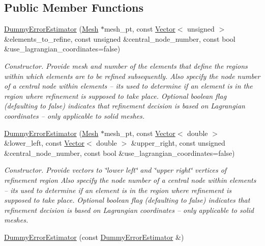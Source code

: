 \subsection*{Public Member Functions}
\begin{DoxyCompactItemize}
\item 
\hyperlink{classoomph_1_1DummyErrorEstimator_a32f15a763f800e451cc9ddec074cd25c}{Dummy\+Error\+Estimator} (\hyperlink{classoomph_1_1Mesh}{Mesh} $\ast$mesh\+\_\+pt, const \hyperlink{classoomph_1_1Vector}{Vector}$<$ unsigned $>$ \&elements\+\_\+to\+\_\+refine, const unsigned \&central\+\_\+node\+\_\+number, const bool \&use\+\_\+lagrangian\+\_\+coordinates=false)
\begin{DoxyCompactList}\small\item\em Constructor. Provide mesh and number of the elements that define the regions within which elements are to be refined subsequently. Also specify the node number of a central node within elements -- it\textquotesingle{}s used to determine if an element is in the region where refinement is supposed to take place. Optional boolean flag (defaulting to false) indicates that refinement decision is based on Lagrangian coordinates -- only applicable to solid meshes. \end{DoxyCompactList}\item 
\hyperlink{classoomph_1_1DummyErrorEstimator_ac08dd82bba49368bb49eb7f58778778f}{Dummy\+Error\+Estimator} (\hyperlink{classoomph_1_1Mesh}{Mesh} $\ast$mesh\+\_\+pt, const \hyperlink{classoomph_1_1Vector}{Vector}$<$ double $>$ \&lower\+\_\+left, const \hyperlink{classoomph_1_1Vector}{Vector}$<$ double $>$ \&upper\+\_\+right, const unsigned \&central\+\_\+node\+\_\+number, const bool \&use\+\_\+lagrangian\+\_\+coordinates=false)
\begin{DoxyCompactList}\small\item\em Constructor. Provide vectors to \char`\"{}lower left\char`\"{} and \char`\"{}upper right\char`\"{} vertices of refinement region Also specify the node number of a central node within elements -- it\textquotesingle{}s used to determine if an element is in the region where refinement is supposed to take place. Optional boolean flag (defaulting to false) indicates that refinement decision is based on Lagrangian coordinates -- only applicable to solid meshes. \end{DoxyCompactList}\item 
\hyperlink{classoomph_1_1DummyErrorEstimator_a69397622563794501de5bbbeb8c072ab}{Dummy\+Error\+Estimator} (const \hyperlink{classoomph_1_1DummyErrorEstimator}{Dummy\+Error\+Estimator} \&)

\end{DoxyCompactItemize}
